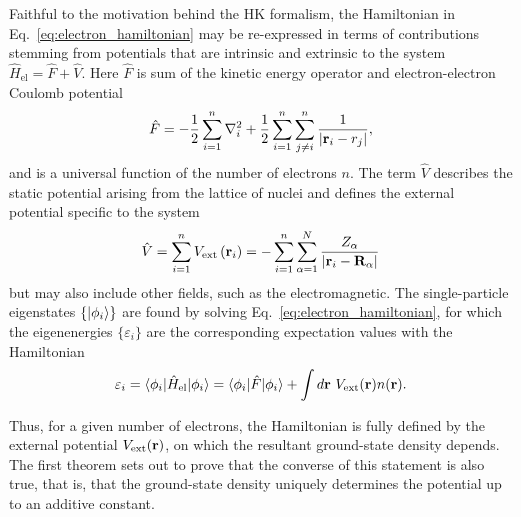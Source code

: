 {
Faithful to the motivation behind the HK formalism,
the Hamiltonian in Eq.~\eqref{eq:electron_hamiltonian} 
may be re-expressed in terms of contributions stemming from 
potentials that are intrinsic and extrinsic to the system 
$\hat{H}_\textrm{el}=\hat{F}+\hat{V}$.}
%
Here $\hat{F}$ is sum of the kinetic energy operator 
and electron-electron Coulomb potential 
\begin{equation}
\hat {F}= -\frac{1}{2}\sum_{i=1}^n\nabla^2_i
+ \frac{1}{2}\sum_{i=1}^n\sum_{j\neq i}^n\frac{1}{|{{\bf r}}_i-r_j|},
\end{equation} 
and is a universal function 
of the number of electrons $n$.
%
The term $\hat{V}$ describes the static 
potential arising from the lattice of nuclei 
and defines the external potential specific to the system 
%
\begin{equation}
\hat{V} =  \sum_{i=1}^n V_\textrm{ext} \left({{{\bf r}}_i}\right) 
= - \sum_{i=1}^n\sum_{\alpha=1}^N\frac{Z_\alpha}{|{{{\bf r}}_i}-{\bf R_\alpha}|} 
\end{equation}
%
{but may also include other fields, 
such as the electromagnetic}.
%
The single-particle eigenstates $\{\vert\phi_i\rangle\}$ are found 
by solving Eq.~\eqref{eq:electron_hamiltonian}, 
for which the eigenenergies $\{\varepsilon_i\}$ 
are the corresponding expectation values with the Hamiltonian 
%
\begin{equation}
\varepsilon_i=\langle\phi_i\vert{\hat{H}_\textrm{el}}\vert\phi_i\rangle
=\langle\phi_i\vert{\hat{F}}\vert\phi_i\rangle 
+ \int d{\bf r}\ V_\textrm{ext}({\bf r})n({\bf r}).
\label{eq:expectation_value}
\end{equation}

Thus, for a given number of electrons, 
the Hamiltonian is fully defined 
by the external potential $V_\textrm{ext}({\bf r})$, 
on which the resultant ground-state density depends. 
%
The first theorem sets out to prove that 
the converse of this statement is also true, 
that is, that the ground-state density 
uniquely determines the potential 
up to an additive constant.

